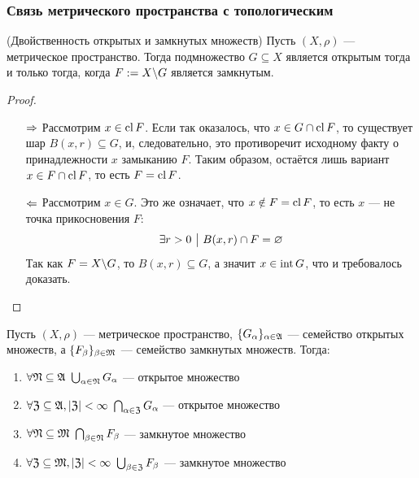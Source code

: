 \subsubsection*{Связь метрического пространства с топологическим}

\begin{theorem} (Двойственность открытых и замкнутых множеств)
	Пусть $(X, \rho)$ --- метрическое пространство. Тогда подмножество $G \subseteq X$ является открытым тогда и только тогда, когда $F := X \backslash G$ является замкнутым.
\end{theorem}

\begin{proof}~
	\begin{itemize}
		\item[$\Rightarrow$] Рассмотрим $x \in \operatorname{cl} F$. Если так оказалось, что $x \in G \cap \operatorname{cl} F$, то существует шар $B(x, r) \subseteq G$, и, следовательно, это противоречит исходному факту о принадлежности $x$ замыканию $F$. Таким образом, остаётся лишь вариант $x \in F \cap \operatorname{cl} F$, то есть $F = \operatorname{cl} F$.
		
		\item[$\Leftarrow$] Рассмотрим $x \in G$. Это же означает, что $x \notin F = \operatorname{cl} F$, то есть $x$ --- не точка прикосновения $F$:
		\[
			\exists r > 0 \ \big|\  B(x, r) \cap F = \varnothing
		\]
		Так как $F = X \backslash G$, то $B(x, r) \subseteq G$, а значит $x \in \operatorname{int} G$, что и требовалось доказать.
	\end{itemize}
\end{proof}

\begin{theorem}
	Пусть $(X, \rho)$ --- метрическое пространство, $\{G_\alpha\}_{\alpha \in \mathfrak{A}}$ --- семейство открытых множеств, а $\{F_\beta\}_{\beta \in \mathfrak{M}}$ --- семейство замкнутых множеств. Тогда:
	\begin{enumerate}
		\item $\forall \gN \subseteq \gA\ \bigcup_{\alpha \in \gN} G_\alpha$ --- открытое множество
		
		\item $\forall \mathfrak{Z} \subseteq \mathfrak{A}, |\mathfrak{Z}| < \infty\ \bigcap_{\alpha \in \mathfrak{Z}} G_\alpha$ --- открытое множество
		
		\item $\forall \gN \subseteq \gM\ \bigcap_{\beta \in \gN} F_\beta$ --- замкнутое множество
		
		\item $\forall \mathfrak{Z} \subseteq \mathfrak{M}, |\mathfrak{Z}| < \infty\ \bigcup_{\beta \in \mathfrak{Z}} F_\beta$ --- замкнутое множество
	\end{enumerate}
\end{theorem}

